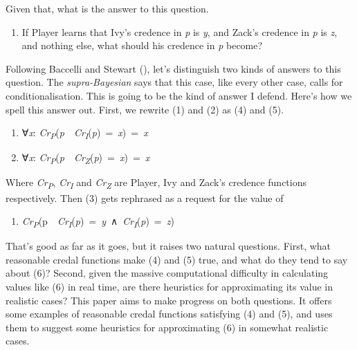 \documentclass[
  10pt,
  letterpaper,
  DIV=11,
  numbers=noendperiod,
  twoside]{scrartcl}
\providecommand{\tightlist}{%
  \setlength{\itemsep}{0pt}\setlength{\parskip}{0pt}}\usepackage{longtable,booktabs,array}
\begin{document}
Given that, what is the answer to this question.

\begin{enumerate}
\def\labelenumi{(\arabic{enumi})}
\setcounter{enumi}{2}
\tightlist
\item
  If Player learns that Ivy's credence in \emph{p} is \emph{y}, and
  Zack's credence in \emph{p} is \emph{z}, and nothing else, what should
  his credence in \emph{p} become?
\end{enumerate}

Following Baccelli and Stewart
(), let's distinguish two kinds
of answers to this question. The \emph{supra-Bayesian} says that this
case, like every other case, calls for conditionalisation. This is going
to be the kind of answer I defend. Here's how we spell this answer out.
First, we rewrite (1) and (2) as (4) and (5).

\begin{enumerate}
\def\labelenumi{(\arabic{enumi})}
\setcounter{enumi}{3}
\tightlist
\item
  ∀\emph{x}:
  \emph{Cr\textsubscript{P}}(\emph{p}~\textbar~\emph{Cr\textsubscript{I}}(\emph{p})~=~\emph{x})~=~\emph{x}
\item
  ∀\emph{x}:
  \emph{Cr\textsubscript{P}}(\emph{p}~\textbar~\emph{Cr\textsubscript{Z}}(\emph{p})~=~\emph{x})~=~\emph{x}
\end{enumerate}

Where \emph{Cr\textsubscript{P}}, \emph{Cr\textsubscript{I}} and
\emph{Cr\textsubscript{Z}} are Player, Ivy and Zack's credence functions
respectively. Then (3) gets rephrased as a request for the value of

\begin{enumerate}
\def\labelenumi{(\arabic{enumi})}
\setcounter{enumi}{5}
\tightlist
\item
  \emph{Cr\textsubscript{P}}(p~\textbar~\emph{Cr\textsubscript{I}}(\emph{p})~=~\emph{y}~∧~\emph{Cr\textsubscript{I}}(\emph{p})~=~\emph{z})
\end{enumerate}

That's good as far as it goes, but it raises two natural questions.
First, what reasonable credal functions make (4) and (5) true, and what
do they tend to say about (6)? Second, given the massive computational
difficulty in calculating values like (6) in real time, are there
heuristics for approximating its value in realistic cases? This paper
aims to make progress on both questions. It offers some examples of
reasonable credal functions satisfying (4) and (5), and uses them to
suggest some heuristics for approximating (6) in somewhat realistic
cases.
\end{document}

